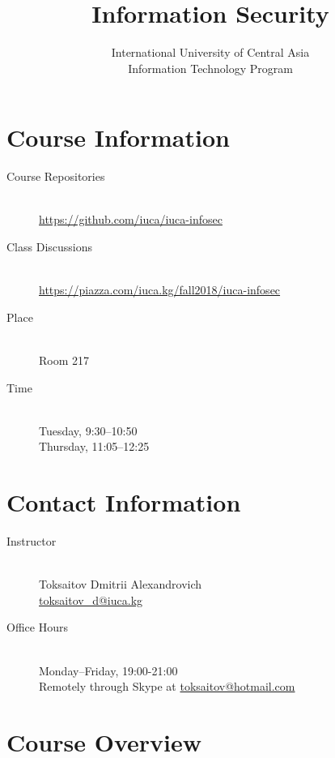 \documentclass[12pt,a4paper,oneside]{article}
\begin{document}
    \title{Information Security}
    \author{
        International University of Central Asia\\
        Information Technology Program
    }
    \date{}
    \maketitle

    \section{Course Information}

        \begin{description}
            \item[Course Repositories]\hfill\\
                \url{https://github.com/iuca/iuca-infosec}
            \item[Class Discussions]\hfill\\
                \url{https://piazza.com/iuca.kg/fall2018/iuca-infosec}
            \item[Place]\hfill\\
                Room 217
            \item[Time]\hfill\\
                Tuesday, 9:30--10:50\\
                Thursday, 11:05--12:25
        \end{description}

    \section{Contact Information}

        \begin{description}
            \item[Instructor]\hfill\\
                Toksaitov Dmitrii Alexandrovich\\
                \href{mailto:toksaitov_d@iuca.kg}{toksaitov\_d@iuca.kg}
            \item[Office Hours]\hfill\\
                Monday--Friday, 19:00-21:00\\
                Remotely through Skype at \href{mailto:toksaitov@hotmail.com}{toksaitov@hotmail.com}
        \end{description}

    \section{Course Overview}
    
\end{document}
